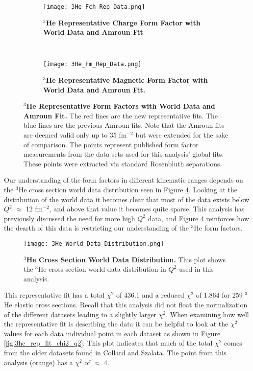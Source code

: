  \begin{figure}[!ht]
\begin{subfigure}{1.\textwidth}
  \centering
  \texttt{[image: 3He\_Fch\_Rep\_Data.png]}
  \caption{\bf{$^3$He Representative Charge Form Factor with World Data and Amroun Fit}}
  \label{fig:3he_fch_rep_data}
\end{subfigure}\\
\begin{subfigure}{1.\textwidth}
  \centering
  \texttt{[image: 3He\_Fm\_Rep\_Data.png]}
  \caption{\bf{$^3$He Representative Magnetic Form Factor with World Data and Amroun Fit.}}
  \label{fig:3he_fm_rep_data}
\end{subfigure}
\caption[$^3$He Representative Form Factors with World Data and Amroun Fit] {
{\bf{$^3$He Representative Form Factors with World Data and Amroun Fit.}} The red lines are the new representative fits. The blue lines are the previous Amroun fits. Note that the Amroun fits are deemed valid only up to 35 fm$^{-2}$ but were extended for the sake of comparison. The points represent published form factor measurements from the data sets used for this analysis' global fits. These points were extracted via standard Rosenbluth separations.}
\label{fig:3he_rep_data}
\end{figure}

Our understanding of the form factors in different kinematic ranges depends on the $^3$He cross section world data distribution seen in Figure \ref{fig:3he_data_distribution}. Looking at the distribution of the world data it becomes clear that most of the data exists below $Q^2$ $\approx$ 12 fm$^{-2}$, and above that value it becomes quite sparse. This analysis has previously discussed the need for more high $Q^2$ data, and Figure \ref{fig:3he_data_distribution} reinforces how the dearth of this data is restricting our understanding of the $^3$He form factors.

\begin{figure}[!ht]
	\begin{center}
	\texttt{[image: 3He\_World\_Data\_Distribution.png]}
	\end{center}
	\caption[$^3$He Cross Section World Data Distribution]{
	{\bf{$^3$He Cross Section World Data Distribution.}} This plot shows the $^3$He cross section world data distribution in $Q^2$ used in this analysis.}
	\label{fig:3he_data_distribution}
\end{figure}

This representative fit has a total $\chi^2$ of 436.1 and a reduced $\chi^2$ of 1.864 for 259 $^3$He elastic cross sections. Recall that this analysis did not float the normalization of the different datasets leading to a slightly larger $\chi^2$. When examining how well the representative fit is describing the data it can be helpful to look at the $\chi^2$ values for each data individual point in each dataset as shown in Figure \ref{fig:3he_rep_fit_chi2_q2}. This plot indicates that much of the total $\chi^2$ comes from the older datasets found in Collard and Szalata. The point from this analysis (orange) has a $\chi^2$ of $\approx$ 4. 

